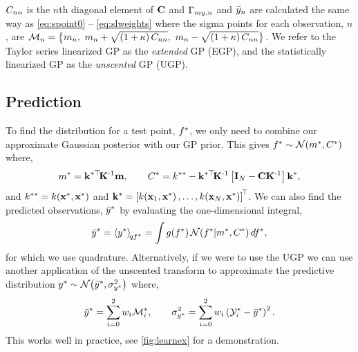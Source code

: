 \documentclass{article} %
\begin{document}
$C_{nn}$ is the $n$th diagonal element of $\mathbf{C}$ and
$\Gamma_{my,n}$ and $\bar{y}_n$ are calculated the same way as
\eqref{eq:spoint0} -- \eqref{eq:slweights} where the sigma points for each
observation, $n$, are $\mathcal{M}_{n} = \big\{m_n,~m_n +
\sqrt{\left({1 + \kappa}\right)C_{nn}},~m_n - \sqrt{\left({1 +
        \kappa}\right)C_{nn}}\big\}$. We refer to the Taylor series linearized
GP as the \emph{extended} GP (EGP), and the statistically linearized GP as the
\emph{unscented} GP (UGP). 


\subsection{Prediction}

To find the distribution for a test point, $f^{*}$, 
we only need to combine our approximate Gaussian posterior with 
our GP prior. This
gives $f^{*} \sim \mathcal{N}\!\left({m^{*}, C^{*}}\right)$ where,
\begin{equation}
    m^{*} = \mathbf{k}^{*\top}\!\mathbf{K}^{\text{-}1}\mathbf{m},
    \qquad
    C^{*} = k^{**} - \mathbf{k}^{*\top}\!\mathbf{K}^{\text{-}1}\left[{\mathbf{I}_{N} -
        \mathbf{C}\mathbf{K}^{\text{-}1}}\right]\mathbf{k}^{*},
\end{equation}
and $k^{**} = k\!\left({\mathbf{x}^{*}, \mathbf{x}^{*}}\right)$ and $\mathbf{k}^{*}
= \left[{k\!\left({\mathbf{x}_1, \mathbf{x}^{*}}\right), \ldots, k\!\left({\mathbf{x}_N,
        \mathbf{x}^{*}}\right)}\right]^{\!\top}$. We can also find the predicted observations,
$\bar{y}^{*}$ by evaluating the one-dimensional integral,
\begin{equation}
    \bar{y}^{*} = \left\langle{\ensuremath{y}\ensuremath{^{*}}}\right\rangle_{\!{qf^{*}}} = \int
        g\!\left({{f^{*}}}\right) \mathcal{N}\!\left({f^{*}}\middle\vert{\ensuremath{m}\ensuremath{^{*}},
            \ensuremath{C}\ensuremath{^{*}}}\right) df^{*},
\end{equation}
for which we use quadrature.
Alternatively, if we were to use the UGP we can use another
application of the unscented transform to approximate the predictive
distribution $y^{*} \sim \mathcal{N}\!\left({\bar{y}^{*}, \sigma^2_{y^{*}}}\right)$ where,
\begin{equation}
    \bar{y}^{*} = \sum^2_{i=0} w_i \mathcal{M}_i^{*}, \qquad 
    \sigma^2_{y^{*}} = \sum^2_{i=0} w_i \left({\mathcal{Y}_i^{*} -
        \bar{y}^{*}}\right)^2.
    \label{eq:slpred}
\end{equation}
This works well in practice, see \autoref{fig:learnex} for a demonstration.
\end{document}
